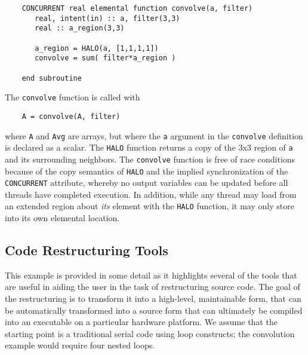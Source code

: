 \begin{verbatim}
    CONCURRENT real elemental function convolve(a, filter)
       real, intent(in) :: a, filter(3,3)
       real :: a_region(3,3)

       a_region = HALO(a, [1,1,1,1])
       convolve = sum( filter*a_region )

    end subroutine
\end{verbatim}

The {\tt convolve} function is called with
\begin{verbatim}
    A = convolve(A, filter)
\end{verbatim}
where {\tt A} and {\tt Avg} are arrays, but where the {\tt a} argument in the
{\tt convolve} definition is declared as a scalar.  The {\tt HALO} function
returns a copy of the 3x3 region of {\tt a} and its surrounding neighbors.  The
{\tt convolve} function is free of race conditions because of the copy semantics
of {\tt HALO} and the implied synchronization of the {\tt CONCURRENT} attribute,
whereby no output variables can be updated before all threads have completed
execution.  In addition, while any thread may load from an extended region
about \emph{its} element with the {\tt HALO} function, it may only store into
its own elemental location.

\subsection{Code Restructuring Tools}

This example is provided in some detail as it highlights several of the tools
that are useful in aiding the user in the task of restructuring source code.
The goal of the restructuring is to transform it into a high-level, maintainable
form, that can be automatically transformed into a source form that can
ultimately be compiled into an executable on a particular hardware platform.  We
assume that the starting point is a traditional serial code using loop
constructs; the convolution example would require four nested loops.

